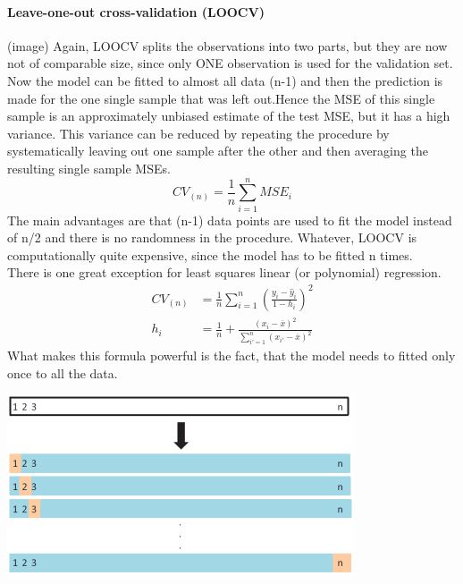 \documentclass[../document.tex]{subfiles}
\begin{document}
	\paragraph{Leave-one-out cross-validation (LOOCV)}
	(image)
	Again, LOOCV splits the observations into two parts, but they are now not of comparable size, since only ONE observation is used for the validation set. Now the model can be fitted to almost all data (n-1) and then the prediction is made for the one single sample that was left out.Hence the MSE of this single sample is an approximately unbiased estimate of the test MSE, but it has a high variance. This variance can be reduced by repeating the procedure by systematically leaving out one sample after the other and then averaging the resulting single sample MSEs.
	\begin{equation}
		CV_{(n)}=\frac{1}{n}\sum_{i=1}^{n}MSE_{i}
	\end{equation}
	The main advantages are that (n-1) data points are used to fit the model instead of n/2 and there is no randomness in the procedure.
	Whatever, LOOCV is computationally quite expensive, since the model has to be fitted n times.\\
	There is one great exception for least squares linear (or polynomial) regression.
	\begin{equation}
	\begin{split}
		CV_{(n)}&=\frac{1}{n}\sum_{i=1}^{n}(\frac{y_{i}-\hat{y}_{i}}{1-h_{i}})^2\\
		h_{i}&=\frac{1}{n}+\frac{(x_{i}-\overline{x})^2}{\sum_{i'=1}^{n}(x_{i'}-\overline{x})^2}
	\end{split}
	\end{equation}
	What makes this formula powerful is the fact, that the model needs to fitted only once to all the data.
	\begin{center}
		\includegraphics[width=.6\textwidth]{pictures/cross_validation_LOOCV.png}
	\end{center}
\end{document}
